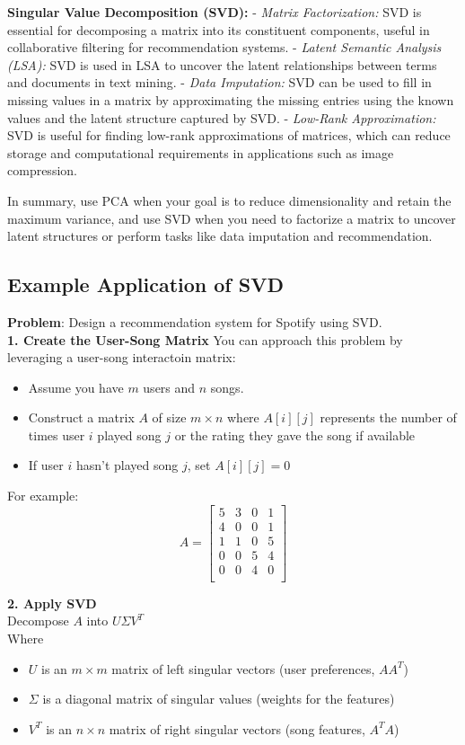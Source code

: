 \documentclass[12pt]{article}
\begin{document}
\textbf{Singular Value Decomposition (SVD):}
- \emph{Matrix Factorization:} SVD is essential for decomposing a matrix into its constituent components, useful in collaborative filtering for recommendation systems.
- \emph{Latent Semantic Analysis (LSA):} SVD is used in LSA to uncover the latent relationships between terms and documents in text mining.
- \emph{Data Imputation:} SVD can be used to fill in missing values in a matrix by approximating the missing entries using the known values and the latent structure captured by SVD.
- \emph{Low-Rank Approximation:} SVD is useful for finding low-rank approximations of matrices, which can reduce storage and computational requirements in applications such as image compression.

In summary, use PCA when your goal is to reduce dimensionality and retain the maximum variance, and use SVD when you need to factorize a matrix to uncover latent structures or perform tasks like data imputation and recommendation.

\subsection{Example Application of SVD}
\textbf{Problem}: Design a recommendation system for Spotify using SVD. \\
\textbf{1. Create the User-Song Matrix}
You can approach this problem by leveraging a user-song interactoin matrix:
\begin{itemize}
\item Assume you have \(m\) users and \(n\) songs.
\item Construct a matrix \(A\) of size \(m \times n\) where \(A[i][j]\) represents the number of times user \(i\) played song \(j\) or the rating they gave the song if available
\item If user \(i\) hasn't played song \(j\), set  \(A[i][j] = 0\) 
\end{itemize}

For example:
\[
A = 
\begin{bmatrix}
5 & 3 & 0 & 1 \\
4 & 0 & 0 & 1 \\
1 & 1 & 0 & 5 \\
0 & 0 & 5 & 4 \\
0 & 0 & 4 & 0 \\
\end{bmatrix}
\]

\textbf{2. Apply SVD}\\
Decompose \(A\) into \(U\Sigma V^T\)\\
Where
\begin{itemize}
\item \(U\) is an \(m \times m\) matrix of left singular vectors (user preferences, \(AA^T\))
\item \(\Sigma\) is a diagonal matrix of singular values (weights for the features)
\item \(V^T\) is an \(n \times n\) matrix of right singular vectors (song features, \(A^TA\))
\end{itemize}
\end{document}
